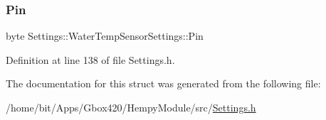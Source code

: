 \subsubsection{\texorpdfstring{Pin}{Pin}}
{\footnotesize\ttfamily byte Settings\+::\+Water\+Temp\+Sensor\+Settings\+::\+Pin}



Definition at line 138 of file Settings.\+h.



The documentation for this struct was generated from the following file\+:\begin{DoxyCompactItemize}
\item 
/home/bit/\+Apps/\+Gbox420/\+Hempy\+Module/src/\hyperlink{_hempy_module_2src_2_settings_8h}{Settings.\+h}\end{DoxyCompactItemize}
